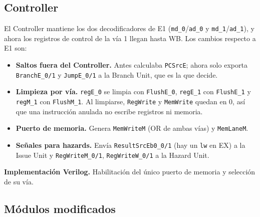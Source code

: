 \documentclass[12pt,a4paper]{article}
\begin{document}
\subsection{Controller}

El Controller mantiene los dos decodificadores de E1 (\texttt{md\_0}/\texttt{ad\_0} y \texttt{md\_1}/\texttt{ad\_1}), y ahora los registros de control de la vía 1 llegan hasta WB. Los cambios respecto a E1 son:

\begin{itemize}
    \item \textbf{Saltos fuera del Controller.} Antes calculaba \texttt{PCSrcE}; ahora solo exporta \texttt{BranchE\_0/1} y \texttt{JumpE\_0/1} a la Branch Unit, que es la que decide.
    \item \textbf{Limpieza por vía.} \texttt{regE\_0} se limpia con \texttt{FlushE\_0}, \texttt{regE\_1} con \texttt{FlushE\_1} y \texttt{regM\_1} con \texttt{FlushM\_1}. Al limpiarse, \texttt{RegWrite} y \texttt{MemWrite} quedan en 0, así que una instrucción anulada no escribe registros ni memoria.
    \item \textbf{Puerto de memoria.} Genera \texttt{MemWriteM} (OR de ambas vías) y \texttt{MemLaneM}.
    \item \textbf{Señales para hazards.} Envía \texttt{ResultSrcEb0\_0/1} (hay un \texttt{lw} en EX) a la Issue Unit y \texttt{RegWriteM\_0/1}, \texttt{RegWriteW\_0/1} a la Hazard Unit.
\end{itemize}


\begin{samepage}
\noindent\textbf{Implementación Verilog.} Habilitación del único puerto de memoria y selección de su vía.
\end{samepage}


\subsection{Módulos modificados}
\end{document}
